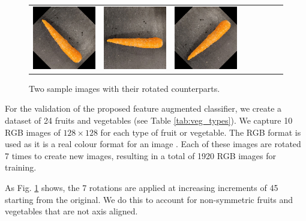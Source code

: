 \begin{figure}[tp]
\begin{center}
\begin{tabular}{c|ccccccc}
			\includegraphics[scale=0.4]{./img/carrot_5.png} &
			\includegraphics[scale=0.4]{./img/carrot_6.png} &
			\includegraphics[scale=0.4]{./img/carrot_7.png} \\
		\end{tabular}
		\label{tab:veg_types}
	\end{center}
	\caption{Two sample images with their rotated counterparts.}
	\label{fig:veg_rotations}
\end{figure}
\egroup

For the validation of the proposed feature augmented classifier, we create a dataset of 24 fruits and vegetables (see Table \ref{tab:veg_types}). We capture 10 RGB images of $128 \times 128$ for each type of fruit or vegetable. The RGB format is used as it is a real colour format for an image \cite{b3_1}. Each of these images are rotated 7 times to create new images, resulting in a total of 1920 RGB images for training.

As Fig. \ref{fig:veg_rotations} shows, the 7 rotations are applied at increasing increments of 45\degree{} starting from the original. We do this to account for non-symmetric fruits and vegetables that are not axis aligned.

